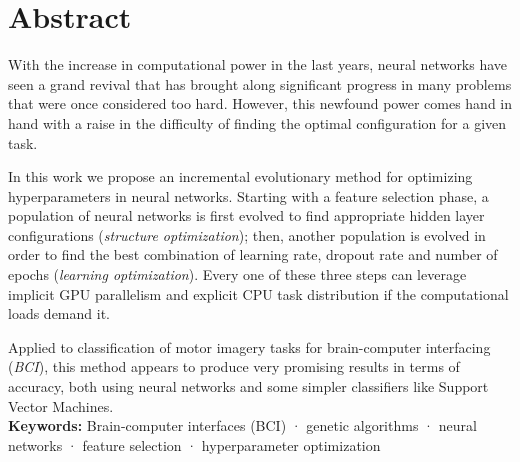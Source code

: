\begingroup
\let\cleardoublepage\relax
\let\cleardoublepage\relax

\chapter*{Abstract}

With the increase in computational power in the last years, neural networks have seen a grand revival that has brought along significant progress in many problems that were once considered too hard. However, this newfound power comes hand in hand with a raise in the difficulty of finding the optimal configuration for a given task.

In this work we propose an incremental evolutionary method for optimizing hyperparameters in neural networks. Starting with a feature selection phase, a population of neural networks is first evolved to find appropriate hidden layer configurations (\textit{structure optimization}); then, another population is evolved in order to find the best combination of learning rate, dropout rate and number of epochs (\textit{learning optimization}). Every one of these three steps can leverage implicit GPU parallelism and explicit CPU task distribution if the computational loads demand it.

Applied to classification of motor imagery tasks for brain-computer interfacing (\textit{BCI}), this method appears to produce very promising results in terms of accuracy, both using neural networks and some simpler classifiers like Support Vector Machines.\\

\textbf{Keywords:} Brain-computer interfaces (BCI) · genetic algorithms · neural networks · feature selection · hyperparameter optimization


\vfill
